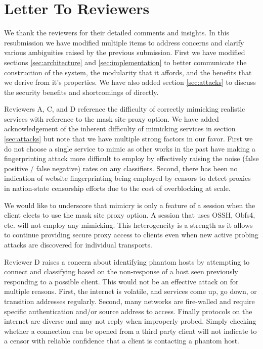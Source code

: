 \section{Letter To Reviewers}

We thank the reviewers for their detailed comments and insights. In this resubmission we have modified 
multiple items to address concerns and clarify various ambiguities raised by the previous submission. 
First we have modified sections \ref{sec:architecture} 
and \ref{sec:implementation} to better communicate the construction of the \scheme system, 
the modularity that it affords, and the benefits that we derive from it's properties. We 
have also added section \ref{sec:attacks} to discuss the security benefits and shortcomings 
of \scheme directly.

Reviewers A, C, and D reference the difficulty of correctly mimicking realistic services with
reference to the mask site proxy option. We have added acknowledgement of the inherent difficulty of mimicking 
services in section \ref{sec:attacks} but note that we have multiple strong factors in our
favor. First we do not choose a single service to mimic as other works in the past have 
\cite{stegotorus, skypemorph, censorspoofer} making a fingerprinting attack more difficult to employ by effectively raising the noise
(false positive / false negative) rates on any classifiers. Second, there has been no indication 
of website fingerprinting being employed by censors to detect proxies in nation-state censorship 
efforts due to the cost of overblocking at scale. 

We would like to underscore that mimicry is only a feature of a \scheme session when the client 
elects to use the mask site proxy option. A \scheme session that uses OSSH, Obfs4, etc. will 
not employ any mimicking. This heterogeneity is a strength as it allows \scheme to continue
providing secure proxy access to clients even when new active probing attacks are discovered for 
individual transports.

Reviewer D raises a concern about identifying phantom hosts by attempting to connect and
classifying based on the non-response of a host seen previously responding to a possible \scheme client. 
This would not be an effective attack on \scheme for multiple reasons. First, the internet is volatile,
and services come up, go down, or transition addresses regularly. Second, many networks are fire-walled
and require specific authentication and/or source address to access. Finally protocols on the internet
are diverse and may not reply when improperly probed. Simply checking whether a connection can be opened 
from a third party client will not indicate to a censor with reliable confidence that a client is 
contacting a phantom host. 

